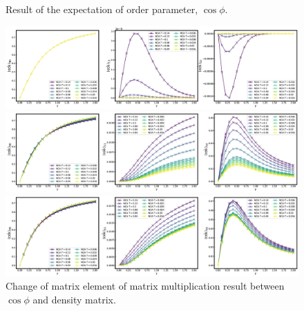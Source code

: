 \documentclass{article}[12pt]
\begin{document}
\begin{spacing}{1.5}
\begin{figure}[htbp]
  \caption{Result of the expectation of order parameter, $\cos\phi$.}
\end{figure}
\begin{figure}[H]
  \centerline{\includegraphics[width=17cm]{TexFigure/Matele_Ns3_alp0.png}}
  \centerline{\includegraphics[width=17cm]{TexFigure/Matele_Ns3_alp0_1.png}}
  \centerline{\includegraphics[width=17cm]{TexFigure/Matele_Ns3_alp1.png}}
  \caption{Change of matrix element of matrix multiplication result between $\cos\phi$ and density matrix.}
\end{figure}

\end{spacing}
\end{document}
